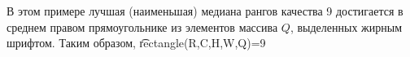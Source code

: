 В этом примере лучшая (наименьшая) медиана рангов качества 9 достигается в среднем
правом прямоугольнике из элементов массива $Q$, выделенных жирным шрифтом. Таким
образом,
\t{rectangle(R,C,H,W,Q)=9}